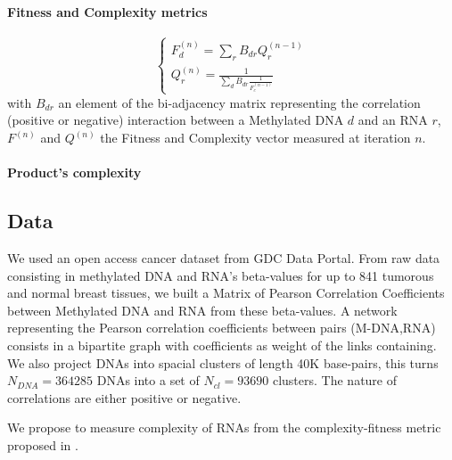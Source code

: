 \documentclass[10pt,a4paper]{article}
\begin{document}
\paragraph{Fitness and Complexity metrics}
\begin{equation}
\left\{
\begin{matrix}
F^{(n)}_{d} =  \sum_{r} B_{dr}Q^{(n-1)}_{r}\\
Q^{(n)}_{r} =  \frac{1}{\sum_{d}B_{dr}\frac{1}{F^{(n-1)}_{c}}}
\end{matrix}
\right.
\end{equation}
with $B_{dr}$ an element of the bi-adjacency matrix representing the correlation (positive or negative) interaction between a Methylated DNA $d$ and an RNA $r$, $F^{(n)}$ and $Q^{(n)}$ the Fitness and Complexity vector measured at iteration $n$.
\paragraph{Product's complexity}
\subsection{Data}
We used an open access cancer dataset from GDC Data Portal. From raw data consisting in methylated DNA and RNA's beta-values for up to 841 tumorous and normal breast tissues, we built a Matrix of Pearson Correlation Coefficients between Methylated DNA and RNA from these beta-values. A network representing the Pearson correlation coefficients between pairs (M-DNA,RNA) consists in a bipartite graph with coefficients as weight of the links containing. We also project DNAs into spacial clusters of length 40K base-pairs, this turns $N_{DNA} = 364285$ DNAs into a set of $N_{cl} = 93690$ clusters. The nature of correlations are either positive or negative.

We propose to measure complexity of RNAs from the complexity-fitness metric proposed in \cite{tacchella12}.
\end{document}
